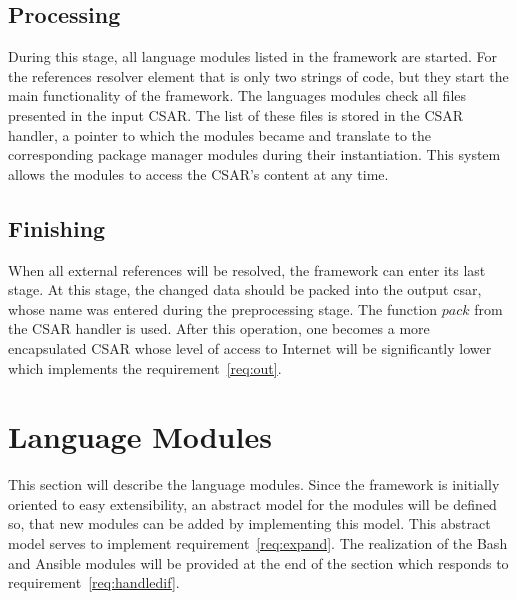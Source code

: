 \subsection*{Processing}
During this stage, all language modules listed in the framework are started.
For the references resolver element that is only two strings of code, but they start the main functionality of the framework.
The languages modules check all files presented in the input CSAR. 
The list of these files is stored in the CSAR handler, a pointer to which the modules became and translate to the corresponding package manager modules during their instantiation.
This system allows the modules to access the CSAR's content at any time.


\subsection*{Finishing}
When all external references will be resolved, the framework can enter its last stage.
At this stage, the changed data should be packed into the output \gls{csar}, whose name was entered during the preprocessing stage.
The function $pack$ from the CSAR handler is used. 
After this operation, one becomes a more encapsulated CSAR whose level of access to Internet will be significantly lower which implements the requirement~\ref{req:out}.

\section{Language Modules} 
This section will describe the language modules. %
Since the framework is initially oriented to easy extensibility, an abstract model for the modules will be defined so, that new modules can be added by implementing this model.
This abstract model serves to implement requirement~\ref{req:expand}.
The realization of the Bash and Ansible modules will be provided at the end of the section which responds to requirement~\ref{req:handledif}.

